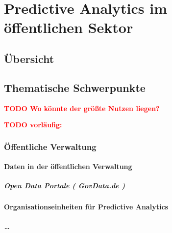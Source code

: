 \documentclass[12pt,a4paper,listof=totoc,oneside]{scrreprt}
\newcommand{\todo}[1]{\textcolor{red}{\textbf{TODO #1}}}
\begin{document}










\tableofcontents
\setcounter{page}{1}





\chapter{Predictive Analytics im öffentlichen Sektor}

\section{Übersicht}

\section{Thematische Schwerpunkte}
\todo{Wo könnte der größte Nutzen liegen?}

\todo{vorläufig:}

\subsection{Öffentliche Verwaltung}

\subsubsection{Daten in der öffentlichen Verwaltung}

\paragraph{Open Data Portale ( GovData.de )}

\subsubsection{Organisationseinheiten für Predictive Analytics}

\paragraph{\ldots}
\end{document}
